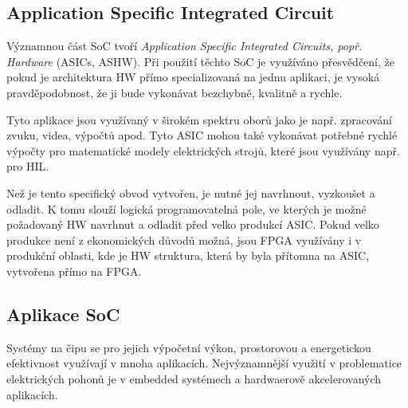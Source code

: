 \documentclass[a4paper, twoside, 11pt]{article}
\begin{document}
	\subsection{Application Specific Integrated Circuit}
		Významnou část SoC tvoří \textit{Application Specific Integrated Circuits, popř. Hardware} (ASICs, ASHW). Při použití těchto SoC je využíváno přesvědčení, že pokud je architektura HW přímo specializovaná na jednu aplikaci, je vysoká pravděpodobnost, že ji bude vykonávat bezchybně, kvalitně a rychle.\par
		Tyto aplikace jsou využívaný v širokém spektru oborů jako je např. zpracování zvuku, videa, výpočtů apod. Tyto ASIC mohou také vykonávat potřebné rychlé výpočty pro matematické modely elektrických strojů, které jsou využívány např. pro HIL.\par
		Než je tento specifický obvod vytvořen, je nutné jej navrhnout, vyzkoušet a odladit. K tomu slouží logická programovatelná pole, ve kterých je možné požadovaný HW navrhnut a odladit před velko produkcí ASIC. Pokud velko produkce není z ekonomických důvodů možná, jsou FPGA využívány i v produkční oblasti, kde je HW struktura, která by byla přítomna na ASIC, vytvořena přímo na FPGA.


	\subsection{Aplikace SoC}
	Systémy na čipu se pro jejich výpočetní výkon, prostorovou a energetickou efektivnost využívají v mnoha aplikacích. Nejvýznamnější využití v problematice elektrických pohonů je v embedded systémech a hardwaerově akcelerovaných aplikacích. 
\end{document}
